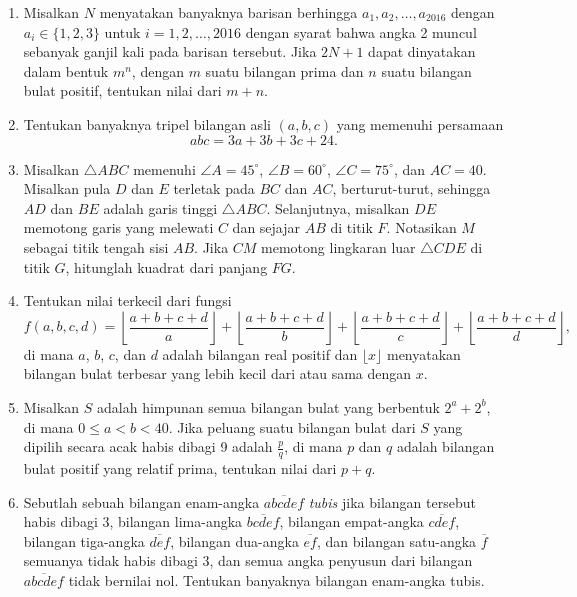 \documentclass[a4paper, 12pt]{article}
\begin{document}
\begin{enumerate}
\item Misalkan $N$ menyatakan banyaknya barisan berhingga $a_1,a_2,\dotsc,a_{2016}$ dengan $a_i\in \{1,2,3\}$ untuk $i=1,2,\dotsc,2016$ dengan syarat bahwa angka 2 muncul sebanyak ganjil kali pada barisan tersebut. Jika $2N+1$ dapat dinyatakan dalam bentuk $m^n$, dengan $m$ suatu bilangan prima dan $n$ suatu bilangan bulat positif, tentukan nilai dari $m+n$.

\item Tentukan banyaknya tripel bilangan asli $(a,b,c)$ yang memenuhi persamaan \[abc=3a+3b+3c+24.\]

\item Misalkan $\triangle ABC$ memenuhi $\angle A=45^\circ$, $\angle B=60^\circ$, $\angle C=75^\circ$, dan $AC=40$. Misalkan pula $D$ dan $E$ terletak pada $BC$ dan $AC$, berturut-turut, sehingga $AD$ dan $BE$ adalah garis tinggi $\triangle ABC$. Selanjutnya, misalkan $DE$ memotong garis yang melewati $C$ dan sejajar $AB$ di titik $F$. Notasikan $M$ sebagai titik tengah sisi $AB$. Jika $CM$ memotong lingkaran luar $\triangle CDE$ di titik $G$, hitunglah kuadrat dari panjang $FG$.

\item Tentukan nilai terkecil dari fungsi \[f(a,b,c,d)=\left\lfloor\frac{a+b+c+d}{a}\right\rfloor + \left\lfloor\frac{a+b+c+d}{b}\right\rfloor + \left\lfloor\frac{a+b+c+d}{c}\right\rfloor + \left\lfloor\frac{a+b+c+d}{d}\right\rfloor,\] di mana $a$, $b$, $c$, dan $d$ adalah bilangan real positif dan $\lfloor{x}\rfloor$ menyatakan bilangan bulat terbesar yang lebih kecil dari atau sama dengan $x$.

\item Misalkan $S$ adalah himpunan semua bilangan bulat yang berbentuk $2^a + 2^b$, di mana $0 \leq a < b < 40$. Jika peluang suatu bilangan bulat dari $S$ yang dipilih secara acak habis dibagi 9 adalah $\frac{p}{q}$, di mana $p$ dan $q$ adalah bilangan bulat positif yang relatif prima, tentukan nilai dari $p + q$.

\item Sebutlah sebuah bilangan enam-angka $\overline{abcdef}$ \textit{tubis} jika bilangan tersebut habis dibagi 3, bilangan lima-angka $\overline{bcdef}$, bilangan empat-angka $\overline{cdef}$, bilangan tiga-angka $\overline{def}$, bilangan dua-angka $\overline{ef}$, dan bilangan satu-angka $\overline{f}$ semuanya tidak habis dibagi 3, dan semua angka penyusun dari bilangan $\overline{abcdef}$ tidak bernilai nol. Tentukan banyaknya bilangan enam-angka tubis.

\end{enumerate}
\end{document}
